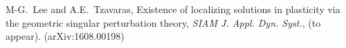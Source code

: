 \documentclass[a4paper,11pt]{article}
\begin{document}
\begin{thebibliography}{10}
% 
% 
% 
% 
% 
% 
% 
%   
%   
% 
  
{\sc M-G.~Lee and A.E.~Tzavaras},
Existence of localizing solutions in plasticity via the geometric singular perturbation theory, 
{\em SIAM J. Appl. Dyn. Syst.}, (to appear). (arXiv:1608.00198)



\end{thebibliography}
\end{document}
